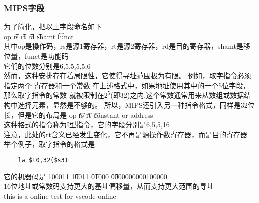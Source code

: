 \documentclass{ctexart}
\begin{document}
\subsubsection{MIPS字段}
为了简化，把以上字段命名如下\\
op \t rs \t rt \t rd \t shamt \t funct \\
其中op是操作码，rs是源1寄存器，rt是源2寄存器，rd是目的寄存器，shamt是移位量，funct是功能码\\
它们的位数分别是6,5,5,5,5,6\\
然而，这种安排存在着局限性，它使得寻址范围极为有限。
例如，取字指令必须指定两个
寄存器和一个常数 在上述格式中，如果地址使用其中的一个5位字段，那么取字指令的常数
就被限制在$2^5$(即32)之内.这个常数通常用来从数组或数据结构中选择元素，显然是不够的。
所以，MIPS还引入另一种指令格式，同样是32位长，但是它的布局是
op \t rs \t rt \t constant or address \\
这种格式的指令称为I型指令，它的字段分别是6,5,5,16\\
注意，此处的rt含义已经发生变化，它不再是源操作数寄存器，而是目的寄存器\\
举个例子，取字指令的格式是
\begin{lstlisting}
    lw $t0,32($s3)
\end{lstlisting}
它的机器码是
100011 \t 10011 \t 01000 \t 0000000000100000 \\
16位地址或常数码支持更大的基址偏移量，从而支持更大范围的寻址\\
this is a online test for vscode online 
\end{document}
